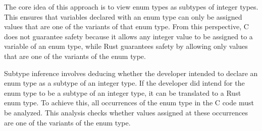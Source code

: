 \documentclass[10pt,conference]{IEEEtran}
\begin{document}

The core idea of this approach is to view enum types as subtypes of integer types. This ensures that variables declared with an enum type can only be assigned values that are one of the variants of that enum type. From this perspective, C does not guarantee safety because it allows any integer value to be assigned to a variable of an enum type, while Rust guarantees safety by allowing only values that are one of the variants of the enum type.


Subtype inference involves deducing whether the developer intended to declare an enum type as a subtype of an integer type. If the developer did intend for the enum type to be a subtype of an integer type, it can be translated to a Rust enum type. To achieve this, all occurrences of the enum type in the C code must be analyzed. This analysis checks whether values assigned at these occurrences are one of the variants of the enum type.

\end{document}
